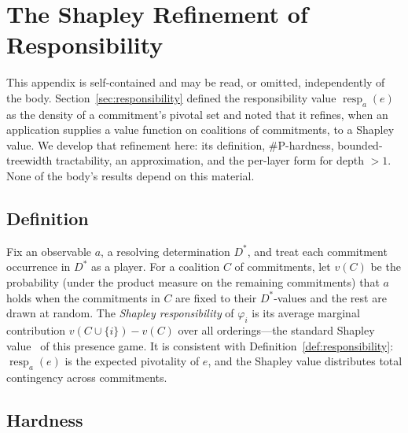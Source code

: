 \section{The Shapley Refinement of Responsibility}
\label{app:responsibility-details}

This appendix is self-contained and may be read, or omitted, independently of
the body. Section~\ref{sec:responsibility} defined the responsibility value
$\operatorname{resp}_a(e)$ as the density of a commitment's pivotal set and
noted that it refines, when an application supplies a value function on
coalitions of commitments, to a Shapley value. We develop that refinement here:
its definition, $\#\mathrm{P}$-hardness, bounded-treewidth tractability, an
approximation, and the per-layer form for depth $>1$. None of the body's
results depend on this material.

\subsection{Definition}

Fix an observable $a$, a resolving determination $D^\ast$, and treat each
commitment occurrence in $D^\ast$ as a player. For a coalition $C$ of
commitments, let $v(C)$ be the probability (under the product measure on the
remaining commitments) that $a$ holds when the commitments in $C$ are fixed to
their $D^\ast$-values and the rest are drawn at random. The \emph{Shapley
responsibility} of $\varphi_i$ is its average marginal contribution
$v(C \cup \{i\}) - v(C)$ over all orderings---the standard Shapley
value~\cite{shapley1953value} of this presence game. It is consistent with
Definition~\ref{def:responsibility}: $\operatorname{resp}_a(e)$ is the
expected pivotality of $e$, and the Shapley value distributes total
contingency across commitments.

\subsection{Hardness}

